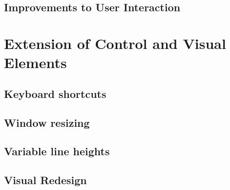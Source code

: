 

	\subsection{Improvements to User Interaction} %
	\label{sub:improvements_to_user_interaction}
	


\section{Extension of Control and Visual Elements} %
\label{sec:extension_of_control_and_visual_elements}

	\subsection{Keyboard shortcuts} %
	\label{sec:keyboard_shortcuts}

	

	\subsection{Window resizing} %
	\label{sec:window_resizing}
	

	\subsection{Variable line heights} %
	\label{sec:variable_line_heights}
	

	\subsection{Visual Redesign} %
	\label{sec:visual_redesign}
	
